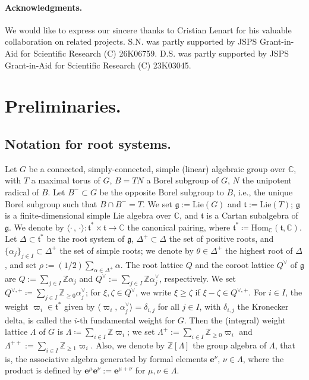 \documentclass[11pt,a4paper,reqno,dvipdfmx]{amsart}
\numberwithin{equation}{section}
\newcommand{\Fg}{\mathfrak{g}}
\newcommand{\Ft}{\mathfrak{t}}
\newcommand{\BZ}{\mathbb{Z}}
\newcommand{\BC}{\mathbb{C}}
\newcommand{\vpi}{\varpi}
\newcommand{\be}{\mathbf{e}}
\newcommand{\Hom}{\mathrm{Hom}}
\newcommand{\Lie}{\mathrm{Lie}}
\newcommand{\pair}[2]{\langle #1,\,#2 \rangle}
\theoremstyle{plain}
\theoremstyle{definition}
\theoremstyle{remark}
\begin{document}
\medskip
%
\paragraph{\bf Acknowledgments.}
We would like to express our sincere thanks to 
Cristian Lenart for his valuable collaboration on related projects.
S.N. was partly supported by JSPS Grant-in-Aid for Scientific Research (C) 26K06759. 
D.S. was partly supported by JSPS Grant-in-Aid for Scientific Research (C) 23K03045.

%
\section{Preliminaries.}
\label{sec:prelim}
%
%
\subsection{Notation for root systems.} \label{subsec:alggrp}
%
Let $G$ be a connected, simply-connected, simple (linear) algebraic group over $\BC$, 
with $T$ a maximal torus of $G$, 
$B=TN$ a Borel subgroup of $G$, $N$ the unipotent radical of $B$.
Let $B^{-} \subset G$ be the opposite Borel subgroup to $B$, i.e., 
the unique Borel subgroup such that $B \cap B^- = T$. 
%
We set $\Fg := \Lie(G)$ and $\Ft := \Lie(T)$; 
$\Fg$ is a finite-dimensional simple Lie algebra over $\BC$, and 
$\Ft$ is a Cartan subalgebra of $\Fg$. 
We denote by $\pair{\cdot\,}{\cdot} : \Ft^{\ast} \times \Ft \rightarrow \BC$ 
the canonical pairing, where $\Ft^{\ast} \coloneqq   \Hom_{\BC}(\Ft, \BC)$. 
Let $\Delta \subset \Ft^{\ast}$ be the root system of $\Fg$, 
$\Delta^{+} \subset \Delta$ the set of positive roots, 
and $\{ \alpha_{j} \}_{j \in I} \subset \Delta^{+}$ the set of simple roots; 
we denote by $\theta \in \Delta^+$ the highest root of $\Delta$, 
and set $\rho := (1/2) \sum_{\alpha \in \Delta^{+}} \alpha$. 
The root lattice $Q$ and the coroot lattice $Q^{\vee}$ of $\Fg$ are 
$Q := \sum_{j \in I} \BZ \alpha_{j}$ and $Q^{\vee} := 
\sum_{j \in I} \BZ \alpha_{j}^{\vee}$, respectively. 
We set $Q^{\vee,+} \coloneqq  \sum_{j \in I} \BZ_{\ge 0} \alpha_{j}^{\vee}$; 
for $\xi,\zeta \in Q^{\vee}$, we write $\xi \ge \zeta$ if $\xi-\zeta \in Q^{\vee,+}$. 
For $i \in I$, the weight $\vpi_{i} \in \Ft^{\ast}$ 
given by $\pair{\vpi_{i}}{\alpha_{j}^{\vee}} = \delta_{i,j}$ for all $j \in I$, 
with $\delta_{i,j}$ the Kronecker delta, 
is called the $i$-th fundamental weight for $G$. 
Then the (integral) weight lattice $\Lambda$ of $G$ is 
$\Lambda \coloneqq \sum_{i \in I} \BZ \vpi_{i}$; 
we set $\Lambda^{+} := \sum_{i \in I} \BZ_{\geq 0} \varpi_i$ and 
$\Lambda^{++} := \sum_{i \in I} \BZ_{\geq 1} \varpi_i$. 
%
Also, we denote by $\BZ[\Lambda]$ the group algebra of $\Lambda$, that is, 
the associative algebra generated by formal elements $\be^{\nu}$, $\nu \in \Lambda$, 
where the product is defined by $\be^{\mu} \be^{\nu}:=
\be^{\mu + \nu}$ for $\mu, \nu \in \Lambda$. 
\end{document}
